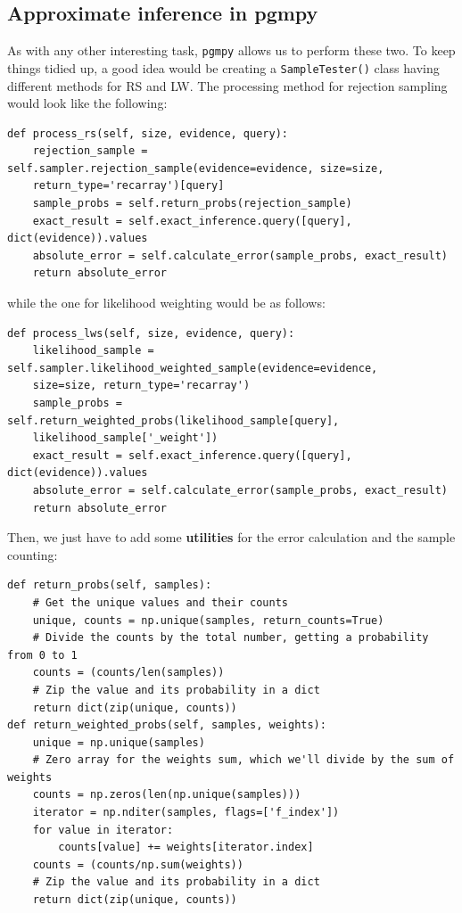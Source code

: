\subsection{Approximate inference in pgmpy}
As with any other interesting task, \texttt{pgmpy} allows us to perform these two. To keep things tidied up, a good idea would be creating a \texttt{SampleTester()} class having different methods for RS and LW. The processing method for rejection sampling would look like the following:
\begin{verbatim}
def process_rs(self, size, evidence, query):
    rejection_sample = self.sampler.rejection_sample(evidence=evidence, size=size,
    return_type='recarray')[query]
    sample_probs = self.return_probs(rejection_sample)
    exact_result = self.exact_inference.query([query], dict(evidence)).values
    absolute_error = self.calculate_error(sample_probs, exact_result)
    return absolute_error
\end{verbatim}
while the one for likelihood weighting would be as follows:
\begin{verbatim}
def process_lws(self, size, evidence, query):
    likelihood_sample = self.sampler.likelihood_weighted_sample(evidence=evidence,
    size=size, return_type='recarray')
    sample_probs = self.return_weighted_probs(likelihood_sample[query],
    likelihood_sample['_weight'])
    exact_result = self.exact_inference.query([query], dict(evidence)).values
    absolute_error = self.calculate_error(sample_probs, exact_result)
    return absolute_error
\end{verbatim}
Then, we just have to add some \textbf{utilities} for the error calculation and the sample counting:
\begin{verbatim}
def return_probs(self, samples):
    # Get the unique values and their counts
    unique, counts = np.unique(samples, return_counts=True)
    # Divide the counts by the total number, getting a probability from 0 to 1
    counts = (counts/len(samples))
    # Zip the value and its probability in a dict
    return dict(zip(unique, counts)) 
def return_weighted_probs(self, samples, weights):
    unique = np.unique(samples)
    # Zero array for the weights sum, which we'll divide by the sum of weights
    counts = np.zeros(len(np.unique(samples))) 
    iterator = np.nditer(samples, flags=['f_index'])
    for value in iterator:
        counts[value] += weights[iterator.index]
    counts = (counts/np.sum(weights))
    # Zip the value and its probability in a dict
    return dict(zip(unique, counts)) 
\end{verbatim}
